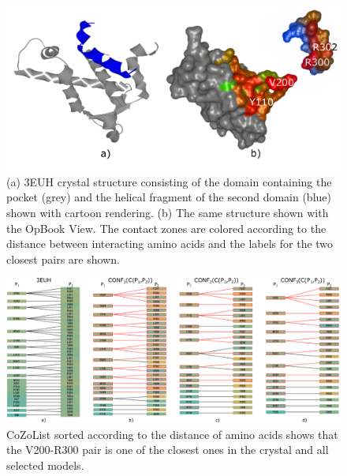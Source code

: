 \documentclass{bmcart}
\begin{document}
\begin{backmatter}
\begin{figure}[h!]
    \centering
    \includegraphics[width=\columnwidth]{images/figure15.pdf}
    \caption{(a) 3EUH crystal structure consisting of the domain containing the pocket (grey) and the helical fragment of the second domain (blue) shown with cartoon rendering. (b) The same structure shown with the OpBook View. The contact zones are colored according to the distance between interacting amino acids and the labels for the two closest pairs are shown.}
  \label{fig:MukEF_crystal_3EUH_selected}
\end{figure}

\begin{figure}[h!]
    \centering
    \includegraphics[width=\columnwidth]{images/figure16.pdf}
    \caption{ CoZoList sorted according to the distance of amino acids shows that the V200-R300 pair is one of the closest ones in the crystal and all selected models.}
  \label{fig:list_pocket_string}
\end{figure}


\end{backmatter}
\end{document}
